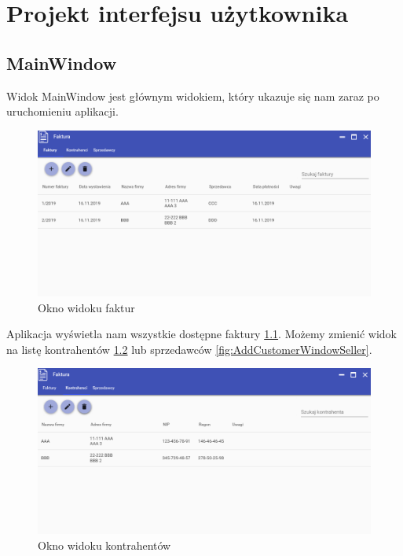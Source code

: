 \chapter{Projekt interfejsu użytkownika}
\section{MainWindow}
Widok MainWindow jest głównym widokiem, który ukazuje się nam zaraz po uruchomieniu aplikacji. 

\begin{figure}[ht!]
\centering
  \includegraphics[width=\linewidth]{Rysunki/Main/InvoiceView.png}
  \caption{Okno widoku faktur}
  \label{fig:AddCustomerWindowInvoice}
\end{figure}

Aplikacja wyświetla nam wszystkie dostępne faktury \ref{fig:AddCustomerWindowInvoice}. Możemy zmienić widok na listę kontrahentów \ref{fig:AddCustomerWindowContractor} lub sprzedawców \ref{fig:AddCustomerWindowSeller}. 

\begin{figure}[ht!]
\centering
  \includegraphics[width=\linewidth]{Rysunki/Main/contractorView.png}
  \caption{Okno widoku kontrahentów}
  \label{fig:AddCustomerWindowContractor}
\end{figure}

